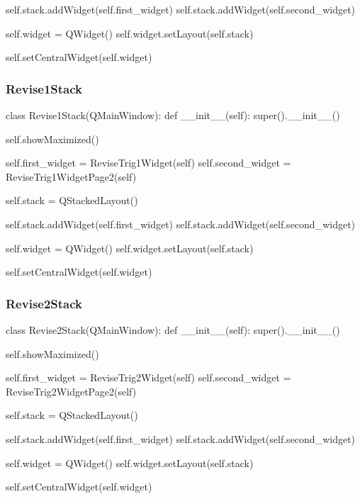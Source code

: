 \begin{landscape}
\begin{python}
        self.stack.addWidget(self.first_widget)
        self.stack.addWidget(self.second_widget)

        self.widget = QWidget()
        self.widget.setLayout(self.stack)

        self.setCentralWidget(self.widget)
\end{python}

\subsubsection{Revise1Stack}

\begin{python}
class Revise1Stack(QMainWindow):
    def __init__(self):
        super().__init__()

        self.showMaximized()
        
        self.first_widget = ReviseTrig1Widget(self)
        self.second_widget = ReviseTrig1WidgetPage2(self)

        self.stack = QStackedLayout()

        self.stack.addWidget(self.first_widget)
        self.stack.addWidget(self.second_widget)

        self.widget = QWidget()
        self.widget.setLayout(self.stack)

        self.setCentralWidget(self.widget)
\end{python}

\subsubsection{Revise2Stack}

\begin{python}
class Revise2Stack(QMainWindow):
    def __init__(self):
        super().__init__()

        self.showMaximized()
        
        self.first_widget = ReviseTrig2Widget(self)
        self.second_widget = ReviseTrig2WidgetPage2(self)

        self.stack = QStackedLayout()

        self.stack.addWidget(self.first_widget)
        self.stack.addWidget(self.second_widget)

        self.widget = QWidget()
        self.widget.setLayout(self.stack)

        self.setCentralWidget(self.widget)
\end{python}


\end{landscape}
